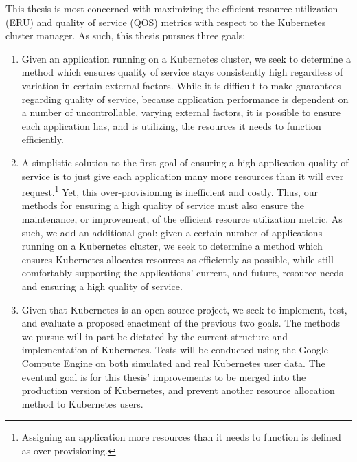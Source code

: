 This thesis is most concerned with maximizing the efficient resource utilization
(ERU) and quality of service (QOS) metrics with respect to the Kubernetes cluster manager.
As such, this thesis pursues three goals:

\begin{enumerate}
  \item Given an application running on a Kubernetes cluster, we seek to
    determine a method which ensures quality of
    service stays consistently high regardless of variation in
    certain external factors. While it is
    difficult to make guarantees regarding quality of service, because
    application performance is dependent on a number of uncontrollable, varying
    external factors, it is possible to
    ensure each application has, and is utilizing, the resources it needs to
    function efficiently.
  \item A simplistic solution to the first goal of ensuring a high application
    quality of service is to just give each application many more resources than
    it will ever request.\footnote{Assigning an application more resources than it needs
    to function is defined as over-provisioning.}
    Yet, this over-provisioning is inefficient and costly. Thus, our
    methods for ensuring a high quality of service must also ensure the
    maintenance, or improvement, of the efficient resource utilization metric.
    As such, we add an additional goal: given a certain number of applications
    running on a Kubernetes cluster,
    we seek to determine a method which ensures Kubernetes allocates resources
    as efficiently as possible, while still comfortably
    supporting the applications' current, and future, resource needs and
    ensuring a high quality of service.
  \item Given that Kubernetes is an open-source project, we seek to implement, test, and
    evaluate a proposed enactment of the previous two goals.
    The methods we pursue will
    in part be dictated by the current structure and implementation of
    Kubernetes. Tests will be conducted using the Google Compute
    Engine\cite{google-compute-engine} on both
    simulated and real Kubernetes user data. The eventual goal is for this
    thesis' improvements to be merged into the production version of Kubernetes,
    and prevent another resource allocation method to Kubernetes users.
\end{enumerate}

